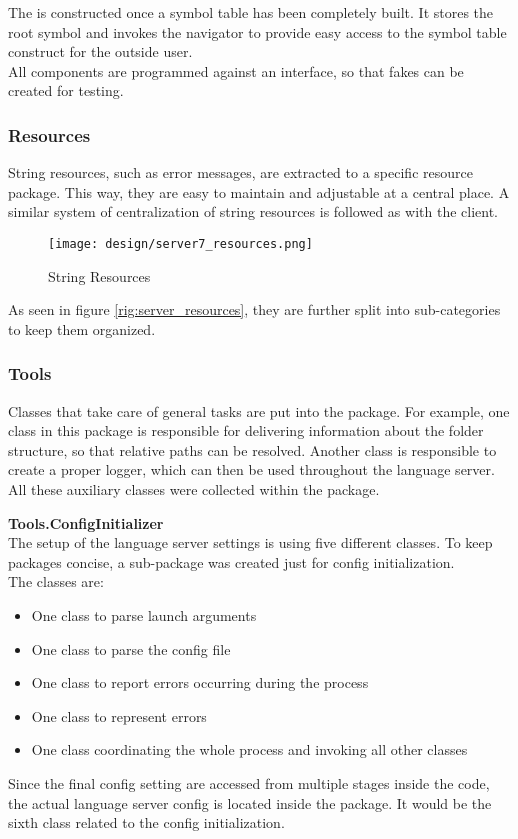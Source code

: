 The  is constructed once a symbol table has been completely built.
It stores the root symbol and invokes the navigator to provide easy access to the symbol table construct for the outside user.\\

All components are programmed against an interface, so that fakes can be created for testing.\\

\subsubsection{Resources}
String resources, such as error messages, are extracted to a specific resource package.
This way, they are easy to maintain and adjustable at a central place.
A similar system of centralization of string resources is followed as with the client.

\begin{figure}[H]
    \centering
    \texttt{[image: design/server7\_resources.png]}
    \caption{String Resources}
    \label{fig:server_resources}
\end{figure}

As seen in figure \ref{rig:server_resources}, they are further split into sub-categories to keep them organized.


\subsubsection{Tools}
Classes that take care of general tasks are put into the  package.
For example, one class in this package is responsible for delivering information about the folder structure, so that relative paths can be resolved.
Another class is responsible to create a proper logger, which can then be used throughout the language server.
All these auxiliary classes were collected within the  package.

\textbf{Tools.ConfigInitializer}\\

The setup of the language server settings is using five different classes.
To keep packages concise, a sub-package was created just for config initialization.\\
The classes are:
\begin{itemize}
    \item One class to parse launch arguments
    \item One class to parse the config file
    \item One class to report errors occurring during the process
    \item One class to represent errors
    \item One class coordinating the whole process and invoking all other classes
\end{itemize}
Since the final config setting are accessed from multiple stages inside the code, the actual language server config is located inside the  package.
It would be the sixth class related to the config initialization.

